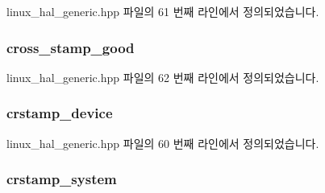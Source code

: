 linux\+\_\+hal\+\_\+generic.\+hpp 파일의 61 번째 라인에서 정의되었습니다.

\subsubsection[{\texorpdfstring{cross\+\_\+stamp\+\_\+good}{cross_stamp_good}}]{ cross\+\_\+stamp\+\_\+good\hspace{0.3cm}{\ttfamily [private]}}\hypertarget{class_linux_timestamper_generic_a44ccbbc368595932d5247f158b0c902e}{}\label{class_linux_timestamper_generic_a44ccbbc368595932d5247f158b0c902e}


linux\+\_\+hal\+\_\+generic.\+hpp 파일의 62 번째 라인에서 정의되었습니다.

\subsubsection[{\texorpdfstring{crstamp\+\_\+device}{crstamp_device}}]{ crstamp\+\_\+device\hspace{0.3cm}{\ttfamily [private]}}\hypertarget{class_linux_timestamper_generic_a64ea949cc4e9e1d47f6e27a68add3888}{}\label{class_linux_timestamper_generic_a64ea949cc4e9e1d47f6e27a68add3888}


linux\+\_\+hal\+\_\+generic.\+hpp 파일의 60 번째 라인에서 정의되었습니다.

\subsubsection[{\texorpdfstring{crstamp\+\_\+system}{crstamp_system}}]{ crstamp\+\_\+system\hspace{0.3cm}{\ttfamily [private]}}\hypertarget{class_linux_timestamper_generic_a885b6a10ac960ef4f2028df1c19c3022}{}\label{class_linux_timestamper_generic_a885b6a10ac960ef4f2028df1c19c3022}



